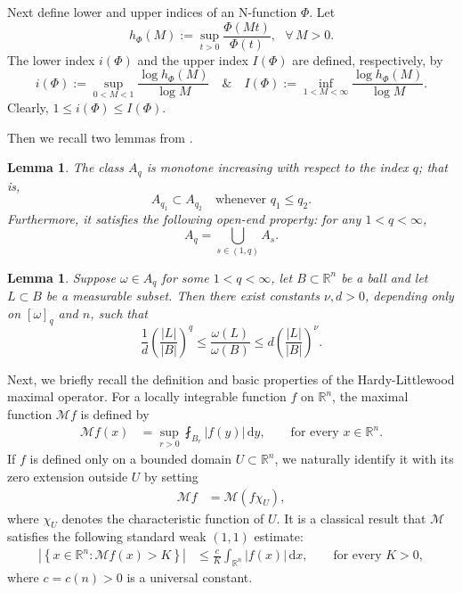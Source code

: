 \documentclass[10pt,a4paper]{article}
\newtheorem{lemma}[theorem]{Lemma}
\theoremstyle{definition}
\numberwithin{equation}{section}
\begin{document}
Next define lower and upper indices of an N-function $\Phi$. Let
$$h_{\Phi}(M):=\sup_{t>0}\frac{\Phi(Mt)}{\Phi(t)}, \ \ \ \forall\, M>0.$$
The lower index $i(\Phi)$ and the upper index $I(\Phi)$ are defined, respectively, by
$$i(\Phi):=\sup_{0<M<1}\frac{\log h_{\Phi}(M)}{\log M}\quad \&\quad
I(\Phi):=\inf_{1<M<\infty}\frac{\log h_{\Phi}(M)}{\log M}.$$
  Clearly, $1\leq i(\Phi) \leq I(\Phi)$.

 
Then we recall two lemmas from \cite[Chapter 7]{g1}.
\begin{lemma}\label{weight1}
The class \( A_q \) is monotone increasing with respect to the index \( q \); that is,
\[
A_{q_1} \subset A_{q_2} \quad \text{whenever } q_1 \leq q_2.
\]
Furthermore, it satisfies the following open-end property: for any \( 1 < q < \infty \),
\[
A_q = \bigcup_{s \in (1,q)} A_s.
\]
\end{lemma}
\begin{lemma}\label{weight2}
Suppose \( \omega \in A_q \) for some \( 1 < q < \infty \),  let \( B \subset \mathbb{R}^n \) be a ball and let \( L \subset B \) be a measurable subset. Then there exist constants \( \nu, d > 0 \), depending only on \([ \omega ]_q\) and \( n \), such that
\[
\frac{1}{d} \left( \frac{|L|}{|B|} \right)^q \leq \frac{\omega(L)}{\omega(B)} \leq d \left( \frac{|L|}{|B|} \right)^{\nu}.
\]
\end{lemma}



Next, we briefly recall the definition and basic properties of the Hardy-Littlewood maximal operator. For a locally integrable function $f$ on $\mathbb{R}^n$, the maximal function $\mathcal{M}f$ is defined by
\begin{align*}
	\mathcal{M}f(x)
	&= \sup_{r>0} \fint_{B_r} |f(y)|\,\mathrm{d}y,
	\qquad \text{for every } x\in\mathbb{R}^n.
\end{align*}
If $f$ is defined only on a bounded domain $U \subset \mathbb{R}^n$, we naturally identify it with its zero extension outside $U$ by setting
\begin{align*}
	\mathcal{M}f &= \mathcal{M}(f\chi_U),
\end{align*}
where $\chi_U$ denotes the characteristic function of $U$. It is a classical result that  $\mathcal{M}$ satisfies the following standard weak $(1,1)$ estimate:
\begin{align}\label{one}
	\left|\left\{ x\in\mathbb{R}^n : \mathcal{M}f(x) > K \right\}\right|
	&\leq \frac{c}{K} \int_{\mathbb{R}^n}|f(x)|\,\mathrm{d}x,
	\qquad \text{for every } K>0,
\end{align}
where $c = c(n) > 0$ is a universal constant.
\end{document}
